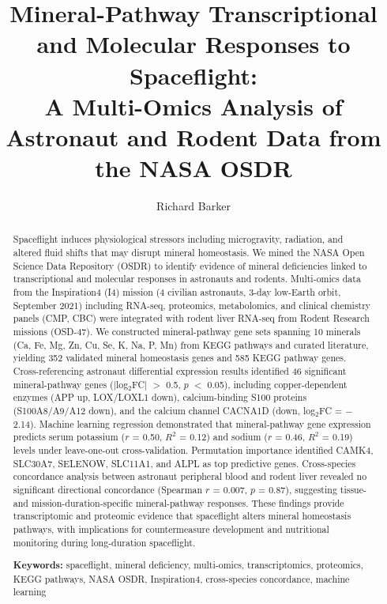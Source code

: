 \documentclass[11pt,a4paper]{article}
\title{Mineral-Pathway Transcriptional and Molecular Responses to Spaceflight: \\
       A Multi-Omics Analysis of Astronaut and Rodent Data from the NASA OSDR}
\author{Richard Barker}
\date{}
\begin{document}
\maketitle

\begin{abstract}
\noindent
Spaceflight induces physiological stressors including microgravity, radiation, and altered fluid shifts that may disrupt mineral homeostasis. We mined the NASA Open Science Data Repository (OSDR) to identify evidence of mineral deficiencies linked to transcriptional and molecular responses in astronauts and rodents. Multi-omics data from the Inspiration4 (I4) mission (4 civilian astronauts, 3-day low-Earth orbit, September 2021) including RNA-seq, proteomics, metabolomics, and clinical chemistry panels (CMP, CBC) were integrated with rodent liver RNA-seq from Rodent Research missions (OSD-47). We constructed mineral-pathway gene sets spanning 10 minerals (Ca, Fe, Mg, Zn, Cu, Se, K, Na, P, Mn) from KEGG pathways and curated literature, yielding 352 validated mineral homeostasis genes and 585 KEGG pathway genes. Cross-referencing astronaut differential expression results identified 46 significant mineral-pathway genes (|log$_2$FC| $>$ 0.5, $p$ $<$ 0.05), including copper-dependent enzymes (APP up, LOX/LOXL1 down), calcium-binding S100 proteins (S100A8/A9/A12 down), and the calcium channel CACNA1D (down, log$_2$FC = $-$2.14). Machine learning regression demonstrated that mineral-pathway gene expression predicts serum potassium ($r$ = 0.50, $R^2$ = 0.12) and sodium ($r$ = 0.46, $R^2$ = 0.19) levels under leave-one-out cross-validation. Permutation importance identified CAMK4, SLC30A7, SELENOW, SLC11A1, and ALPL as top predictive genes. Cross-species concordance analysis between astronaut peripheral blood and rodent liver revealed no significant directional concordance (Spearman $r$ = 0.007, $p$ = 0.87), suggesting tissue- and mission-duration-specific mineral-pathway responses. These findings provide transcriptomic and proteomic evidence that spaceflight alters mineral homeostasis pathways, with implications for countermeasure development and nutritional monitoring during long-duration spaceflight.

\medskip
\noindent\textbf{Keywords:} spaceflight, mineral deficiency, multi-omics, transcriptomics, proteomics, KEGG pathways, NASA OSDR, Inspiration4, cross-species concordance, machine learning
\end{abstract}
\end{document}
